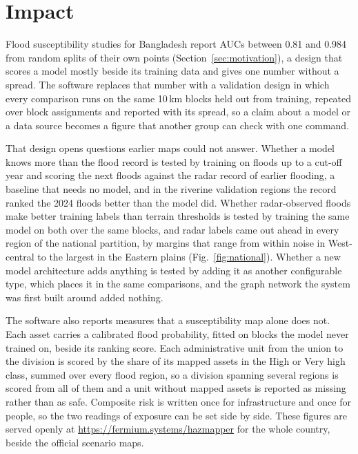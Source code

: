 \documentclass[preprint,12pt]{elsarticle}
\begin{document}
\section{Impact}

Flood susceptibility studies for Bangladesh report AUCs between 0.81 and 0.984 from random splits of their own points (Section~\ref{sec:motivation}), a design that scores a model mostly beside its training data and gives one number without a spread. The software replaces that number with a validation design in which every comparison runs on the same 10\,km blocks held out from training, repeated over \RRBenchSeeds{} block assignments and reported with its spread, so a claim about a model or a data source becomes a figure that another group can check with one command.

That design opens questions earlier maps could not answer. Whether a model knows more than the flood record is tested by training on floods up to a cut-off year and scoring the next floods against the radar record of earlier flooding, a baseline that needs no model, and in the riverine validation regions the record ranked the 2024 floods better than the model did. Whether radar-observed floods make better training labels than terrain thresholds is tested by training the same model on both over the same blocks, and radar labels came out ahead in every region of the national partition, by margins that range from within noise in West-central to the largest in the Eastern plains (Fig.~\ref{fig:national}). Whether a new model architecture adds anything is tested by adding it as another configurable type, which places it in the same comparisons, and the graph network the system was first built around added nothing.

The software also reports measures that a susceptibility map alone does not. Each asset carries a calibrated flood probability, fitted on blocks the model never trained on, beside its ranking score. Each administrative unit from the union to the division is scored by the share of its mapped assets in the High or Very high class, summed over every flood region, so a division spanning several regions is scored from all of them and a unit without mapped assets is reported as missing rather than as safe. Composite risk is written once for infrastructure and once for people, so the two readings of exposure can be set side by side. These figures are served openly at \url{https://fermium.systems/hazmapper} for the whole country, beside the official scenario maps.
\end{document}
